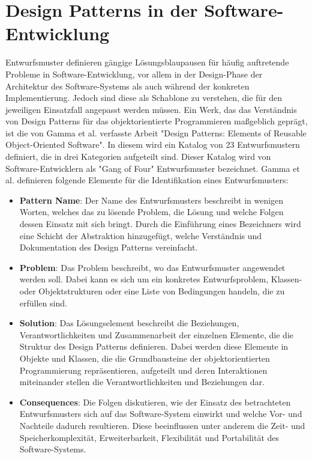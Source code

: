 \section{Design Patterns in der Software-Entwicklung}

Entwurfsmuster definieren gängige Lösungsblaupausen für häufig auftretende Probleme in Software-Entwicklung, vor allem in der Design-Phase der Architektur des Software-Systems als auch während der konkreten Implementierung. Jedoch sind diese als Schablone zu verstehen, die für den jeweiligen Einsatzfall angepasst werden müssen.
Ein Werk, das das Verständnis von Design Patterns für das objektorientierte Programmieren maßgeblich geprägt, ist die von Gamma et al. verfasste Arbeit "Design Patterns: Elements of Reusable Object-Oriented Software".
In diesem wird ein Katalog von 23 Entwurfsmustern definiert, die in drei Kategorien aufgeteilt sind. Dieser Katalog wird von Software-Entwicklern als "Gang of Four" Entwurfsmuster bezeichnet. Gamma et al. definieren folgende Elemente für die Identifikation eines Entwurfsmusters:\cite[S. 3]{gamma1994design}

\begin{itemize}
    \item \textbf{Pattern Name}: Der Name des Entwurfsmusters beschreibt in wenigen Worten, welches das zu lösende Problem, die Lösung und welche Folgen dessen Einsatz mit sich bringt. Durch die Einführung eines Bezeichners wird eine Schicht der Abstraktion hinzugefügt, welche Verständnis und Dokumentation des Design Patterns vereinfacht.
    \item \textbf{Problem}: Das Problem beschreibt, wo das Entwurfsmuster angewendet werden soll. Dabei kann es sich um ein konkretes Entwurfsproblem, Klassen- oder Objektstrukturen oder eine Liste von Bedingungen handeln, die zu erfüllen sind.
    \item \textbf{Solution}: Das Lösungselement beschreibt die Beziehungen, Verantwortlichkeiten und Zusammenarbeit der einzelnen Elemente, die die Struktur des Design Patterns definieren. Dabei werden diese Elemente in Objekte und Klassen, die die Grundbausteine der objektorientierten Programmierung repräsentieren, aufgeteilt und deren Interaktionen miteinander stellen die Verantwortlichkeiten und Beziehungen dar.
    \item \textbf{Consequences}: Die Folgen diskutieren, wie der Einsatz des betrachteten Entwurfsmusters sich auf das Software-System einwirkt und welche Vor- und Nachteile dadurch resultieren. Diese beeinflussen unter anderem die Zeit- und Speicherkomplexität, Erweiterbarkeit, Flexibilität und Portabilität des Software-Systems.
\end{itemize}

